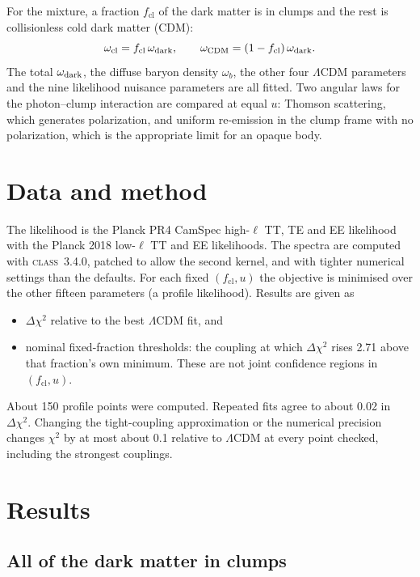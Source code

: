 \documentclass[11pt,a4paper]{article}
\newcommand{\cl}{\mathrm{cl}}
\newcommand{\dchi}{\Delta\chi^2}
\begin{document}
For the mixture, a fraction $f_\cl$ of the dark matter is in clumps and the rest is collisionless cold dark matter (CDM):
\begin{equation}
\omega_\cl = f_\cl\,\omega_{\rm dark}, \qquad \omega_{\rm CDM} = (1-f_\cl)\,\omega_{\rm dark}.
\end{equation}
The total $\omega_{\rm dark}$, the diffuse baryon density $\omega_b$, the other four $\Lambda$CDM parameters and the nine likelihood nuisance parameters are all fitted. Two angular laws for the photon--clump interaction are compared at equal $u$: Thomson scattering, which generates polarization, and uniform re-emission in the clump frame with no polarization, which is the appropriate limit for an opaque body.

\section{Data and method}

The likelihood is the Planck PR4 CamSpec high-$\ell$ TT, TE and EE likelihood with the Planck 2018 low-$\ell$ TT and EE likelihoods. The spectra are computed with \textsc{class}~3.4.0, patched to allow the second kernel, and with tighter numerical settings than the defaults. For each fixed $(f_\cl, u)$ the objective is minimised over the other fifteen parameters (a profile likelihood). Results are given as
\begin{itemize}
\item $\dchi$ relative to the best $\Lambda$CDM fit, and
\item nominal fixed-fraction thresholds: the coupling at which $\dchi$ rises 2.71 above that fraction's own minimum. These are not joint confidence regions in $(f_\cl, u)$.
\end{itemize}
About 150 profile points were computed. Repeated fits agree to about 0.02 in $\dchi$. Changing the tight-coupling approximation or the numerical precision changes $\chi^2$ by at most about 0.1 relative to $\Lambda$CDM at every point checked, including the strongest couplings.

\section{Results}
\label{sec:results}

\subsection{All of the dark matter in clumps}
\end{document}
